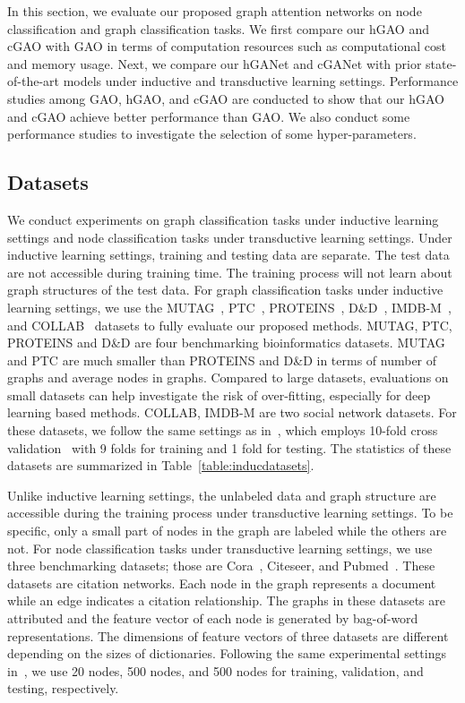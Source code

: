 \documentclass[sigconf]{acmart}
\begin{document}
In this section, we evaluate our proposed graph attention networks
on node classification and graph classification tasks. We first
compare our hGAO and cGAO with GAO in terms of computation resources
such as computational cost and memory usage. Next, we compare our
hGANet and cGANet with prior state-of-the-art models under inductive
and transductive learning settings. Performance studies among GAO,
hGAO, and cGAO are conducted to show that our hGAO and cGAO achieve
better performance than GAO. We also conduct some performance
studies to investigate the selection of some hyper-parameters.

\subsection{Datasets}\label{sec:dataset}

We conduct experiments on graph classification tasks under inductive
learning settings and node classification tasks under transductive
learning settings. Under inductive learning settings, training and
testing data are separate. The test data are not accessible during
training time. The training process will not learn about graph
structures of the test data. For graph classification tasks under
inductive learning settings, we use the
MUTAG~\cite{niepert2016learning}, PTC~\cite{niepert2016learning},
PROTEINS~\cite{borgwardt2005protein},
D\&D~\cite{dobson2003distinguishing},
IMDB-M~\cite{yanardag2015structural}, and
COLLAB~\cite{yanardag2015structural} datasets to fully evaluate our
proposed methods. MUTAG, PTC, PROTEINS and D\&D are four
benchmarking bioinformatics datasets. MUTAG and PTC are much smaller
than PROTEINS and D\&D in terms of number of graphs and average
nodes in graphs. Compared to large datasets, evaluations on small
datasets can help investigate the risk of over-fitting, especially
for deep learning based methods. COLLAB, IMDB-M are two social
network datasets. For these datasets, we follow the same settings as
in~\cite{zhang2018end}, which employs 10-fold cross
validation~\cite{chang2011libsvm} with 9 folds for training and 1
fold for testing. The statistics of these datasets are summarized in
Table~\ref{table:inducdatasets}.


Unlike inductive learning settings, the unlabeled data and graph structure are
accessible during the training process under transductive learning settings.
To be specific, only a small part of nodes in the graph are labeled while the
others are not. For node classification tasks under transductive learning
settings, we use three benchmarking datasets; those are
Cora~\cite{sen2008collective}, Citeseer, and Pubmed~\cite{kipf2016semi}. These
datasets are citation networks. Each node in the graph represents a document
while an edge indicates a citation relationship. The graphs in these datasets
are attributed and the feature vector of each node is generated by bag-of-word
representations. The dimensions of feature vectors of three datasets are
different depending on the sizes of dictionaries. Following the same
experimental settings in~\cite{kipf2016semi}, we use 20 nodes, 500 nodes, and
500 nodes for training, validation, and testing, respectively.
\end{document}
